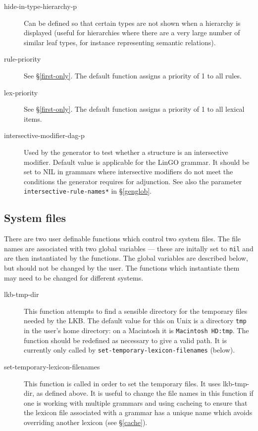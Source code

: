 \documentclass[12pt]{report}
\newcommand{\filename}[1]{{\tt #1}}
\newcommand{\functionname}[1]{{\tt #1}}
\newcommand{\lkbparam}[1]{{\tt #1}}
\begin{document}
\begin{description}
\item[hide-in-type-hierarchy-p] Can be defined so that certain types
are not shown when a hierarchy is displayed (useful for hierarchies
where there are a very large number of similar leaf types, for instance
representing semantic relations).

\item[rule-priority] See \S\ref{first-only}.  The default function
assigns a priority of 1 to all rules.
\item[lex-priority] See \S\ref{first-only}.  The default function
assigns a priority of 1 to all lexical items.

\item[intersective-modifier-dag-p] Used by the generator to test whether a 
structure is an intersective modifier.  Default value is applicable
for the LinGO grammar.  It should be set to NIL in grammars where
intersective modifiers do not meet the conditions the generator requires for
adjunction.  See also the parameter \lkbparam{*intersective-rule-names*}
in \S\ref{genglob}.
\end{description}

\subsection{System files}
\label{sysglob}

There are two user definable functions which control two system files.
The file names are associated with two global variables --- these are
initally set to {\tt nil} and are then instantiated by the functions.  The
global variables are described below, but should not be changed
by the user.  The functions which instantiate them may need to be changed
for different systems.

\begin{description}
\item[lkb-tmp-dir] This function attempts to find a sensible directory for
the temporary files needed by the LKB.  The default value for this
on Unix is a directory \filename{tmp} 
in the user's home directory: on a Macintosh
it is \filename{Macintosh HD:tmp}.  
The function should be redefined as necessary
to give a valid path.  It is currently only called by 
\functionname{set-temporary-lexicon-filenames} (below).

\item[set-temporary-lexicon-filenames] This function is called in order to
set the temporary files.  It uses lkb-tmp-dir, as defined above.
It is useful to change the file names in this function if one is
working with multiple grammars and using cacheing to
ensure that the lexicon file associated with a grammar has a 
unique name which avoids overriding another lexicon
(see \S\ref{cache}).
\end{description}
\end{document}
